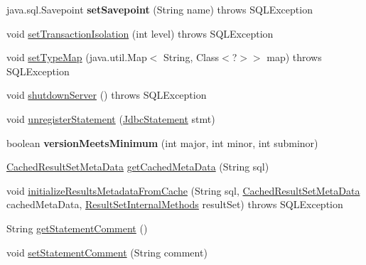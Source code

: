 \begin{DoxyCompactItemize}
java.\+sql.\+Savepoint {\bfseries set\+Savepoint} (String name)  throws S\+Q\+L\+Exception 
\item 
void \mbox{\hyperlink{classcom_1_1mysql_1_1cj_1_1jdbc_1_1_connection_impl_a5555f54beb90978116a2c340a4f11ff3}{set\+Transaction\+Isolation}} (int level)  throws S\+Q\+L\+Exception 
\item 
void \mbox{\hyperlink{classcom_1_1mysql_1_1cj_1_1jdbc_1_1_connection_impl_a8cad56f950d2e2faa07c1d8e46116475}{set\+Type\+Map}} (java.\+util.\+Map$<$ String, Class$<$?$>$$>$ map)  throws S\+Q\+L\+Exception 
\item 
void \mbox{\hyperlink{classcom_1_1mysql_1_1cj_1_1jdbc_1_1_connection_impl_ad33978512e58f5bb84875219ffd8af41}{shutdown\+Server}} ()  throws S\+Q\+L\+Exception 
\item 
void \mbox{\hyperlink{classcom_1_1mysql_1_1cj_1_1jdbc_1_1_connection_impl_a5f86d22252d24d3b0ddf4cb2c7afd4b7}{unregister\+Statement}} (\mbox{\hyperlink{interfacecom_1_1mysql_1_1cj_1_1jdbc_1_1_jdbc_statement}{Jdbc\+Statement}} stmt)
\item 
\mbox{\label{classcom_1_1mysql_1_1cj_1_1jdbc_1_1_connection_impl_ac05be5f30a9c8aec5773f2b75cd7ab4d}} 
boolean {\bfseries version\+Meets\+Minimum} (int major, int minor, int subminor)
\item 
\mbox{\hyperlink{interfacecom_1_1mysql_1_1cj_1_1jdbc_1_1result_1_1_cached_result_set_meta_data}{Cached\+Result\+Set\+Meta\+Data}} \mbox{\hyperlink{classcom_1_1mysql_1_1cj_1_1jdbc_1_1_connection_impl_a8c812f82a9cb453fa511263b0c024362}{get\+Cached\+Meta\+Data}} (String sql)
\item 
void \mbox{\hyperlink{classcom_1_1mysql_1_1cj_1_1jdbc_1_1_connection_impl_a437610f56077be57e534f45fd9212669}{initialize\+Results\+Metadata\+From\+Cache}} (String sql, \mbox{\hyperlink{interfacecom_1_1mysql_1_1cj_1_1jdbc_1_1result_1_1_cached_result_set_meta_data}{Cached\+Result\+Set\+Meta\+Data}} cached\+Meta\+Data, \mbox{\hyperlink{interfacecom_1_1mysql_1_1cj_1_1jdbc_1_1result_1_1_result_set_internal_methods}{Result\+Set\+Internal\+Methods}} result\+Set)  throws S\+Q\+L\+Exception 
\item 
String \mbox{\hyperlink{classcom_1_1mysql_1_1cj_1_1jdbc_1_1_connection_impl_a4ac13f311c3ef1e5e6718b17f3b5e090}{get\+Statement\+Comment}} ()
\item 
void \mbox{\hyperlink{classcom_1_1mysql_1_1cj_1_1jdbc_1_1_connection_impl_ae62d28e9ed05949b66aa0ea00633d51d}{set\+Statement\+Comment}} (String comment)
$$
\end{DoxyCompactItemize}
